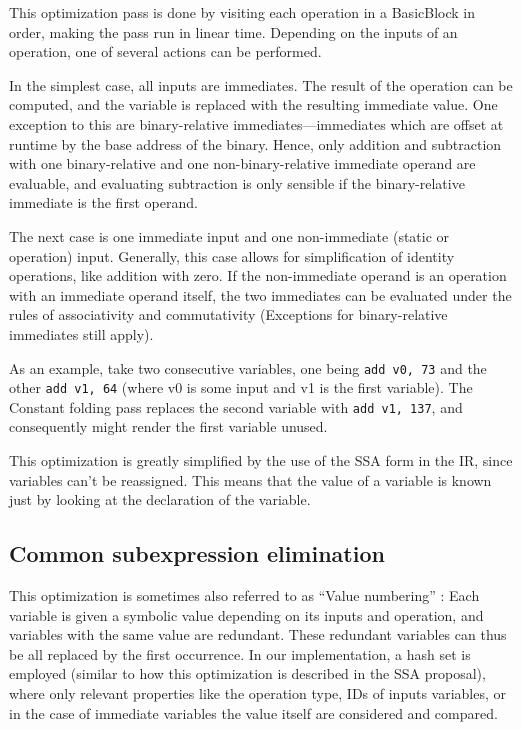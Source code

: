 \documentclass[course=eragp]{aspdoc}
\begin{document}
This optimization pass is done by visiting each operation in a BasicBlock in order, making the pass run in linear time.
Depending on the inputs of an operation, one of several actions can be performed.

In the simplest case, all inputs are immediates. The result of the operation can be computed, and the variable is
replaced with the resulting immediate value. One exception to this are binary-relative immediates---immediates which are
offset at runtime by the base address of the binary. Hence, only addition and subtraction with one binary-relative and
one non-binary-relative immediate operand are evaluable, and evaluating subtraction is only sensible if the
binary-relative immediate is the first operand.

The next case is one immediate input and one non-immediate (static or operation) input. Generally, this case allows for
simplification of identity operations, like addition with zero. If the non-immediate operand is an operation with an
immediate operand itself, the two immediates can be evaluated under the rules of associativity and commutativity
(Exceptions for binary-relative immediates still apply).


As an example, take two consecutive variables, one being \texttt{add v0, 73} and the other \texttt{add v1, 64} (where v0
is some input and v1 is the first variable). The Constant folding pass replaces the second variable with \texttt{add v1,
137}, and consequently might render the first variable unused.

This optimization is greatly simplified by the use of the SSA form in the IR, since variables can't be
reassigned. This means that the value of a variable is known just by looking at the declaration of the variable.

\subsection{Common subexpression elimination}

This optimization is sometimes also referred to as ``Value numbering'' \cite[p.~24]{ssa_proposal}: Each variable is
given a symbolic value depending on its inputs and operation, and variables with the same value are redundant. These
redundant variables can thus be all replaced by the first occurrence. In our implementation, a hash set is employed
(similar to how this optimization is described in the SSA proposal), where only relevant properties like the operation
type, IDs of inputs variables, or in the case of immediate variables the value itself are considered and compared.
\end{document}
